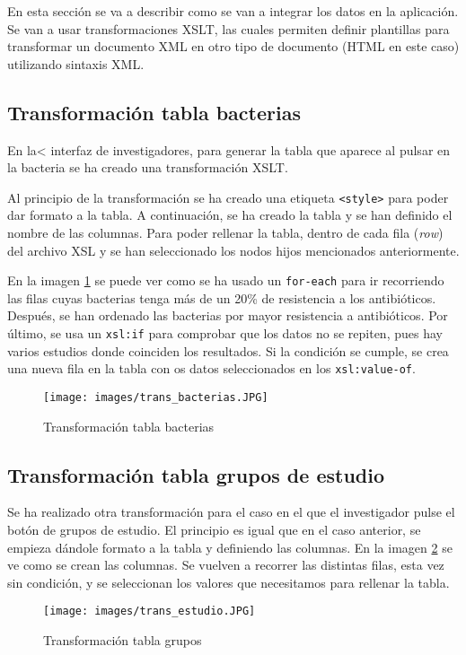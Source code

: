 \documentclass[../main.tex]{subfiles}
\begin{document}
En esta sección se va a describir como se van a integrar los datos en la aplicación. Se van a usar transformaciones XSLT, las cuales permiten definir plantillas para transformar un documento XML en otro tipo de documento (HTML en este caso) utilizando sintaxis XML.

\subsection{Transformación tabla bacterias}

En la< interfaz de investigadores, para generar la tabla que aparece al pulsar en la bacteria se ha creado una transformación XSLT.

Al principio de la transformación se ha creado una etiqueta \texttt{<style>} para poder dar formato a la tabla. A continuación, se ha creado la tabla y se han definido el nombre de las columnas. Para poder rellenar la tabla, dentro de cada fila (\textit{row}) del archivo XSL y se han seleccionado los nodos hijos mencionados anteriormente.

En la imagen \ref{transB} se puede ver como se ha usado un \texttt{for-each} para ir recorriendo las filas cuyas bacterias tenga más de un 20\% de resistencia a los antibióticos. Después, se han ordenado las bacterias por mayor resistencia a antibióticos. Por último, se usa un \texttt{xsl:if} para comprobar que los datos no se repiten, pues hay varios estudios donde coinciden los resultados. Si la condición se cumple, se crea una nueva fila en la tabla con os datos seleccionados en los \texttt{xsl:value-of}.

\newpage

\begin{figure}[h]
    \centering
    \texttt{[image: images/trans\_bacterias.JPG]}
    \caption{Transformación tabla bacterias}
    \label{transB}
\end{figure}

\subsection{Transformación tabla grupos de estudio}

Se ha realizado otra transformación para el caso en el que el investigador pulse el botón de grupos de estudio. El principio es igual que en el caso anterior, se empieza dándole formato a la tabla y definiendo las columnas. En la imagen \ref{transG} se ve como se crean las columnas. Se vuelven a recorrer las distintas filas, esta vez sin condición, y se seleccionan los valores que necesitamos para rellenar la tabla.

\begin{figure}[h]
    \centering
    \texttt{[image: images/trans\_estudio.JPG]}
    \caption{Transformación tabla grupos}
    \label{transG}
\end{figure}
\end{document}

